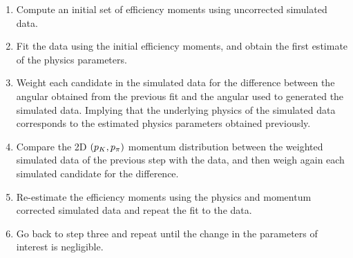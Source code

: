 \begin{enumerate}
\item Compute an initial set of efficiency moments using uncorrected \BsJpsiKst simulated data.
\item Fit the \BsJpsiKst data using the initial efficiency moments, and obtain the first estimate of the physics parameters.
\item Weight each candidate in the simulated data for the difference between the angular \pdf obtained from the previous fit
      and the angular \pdf used to generated the simulated data. Implying that the underlying physics of the simulated data corresponds
      to the estimated physics parameters obtained previously.
\item Compare the 2D $(p_K,p_\pi)$ momentum distribution between the weighted simulated data of the previous step with the
      data, and then weigh again each simulated candidate for the difference.
\item Re-estimate the efficiency moments using the physics and momentum corrected \BsJpsiKst simulated data and repeat the fit to the \BsJpsiKst data.
\item Go back to step three and repeat until the change in the parameters of interest is negligible.
\end{enumerate}

